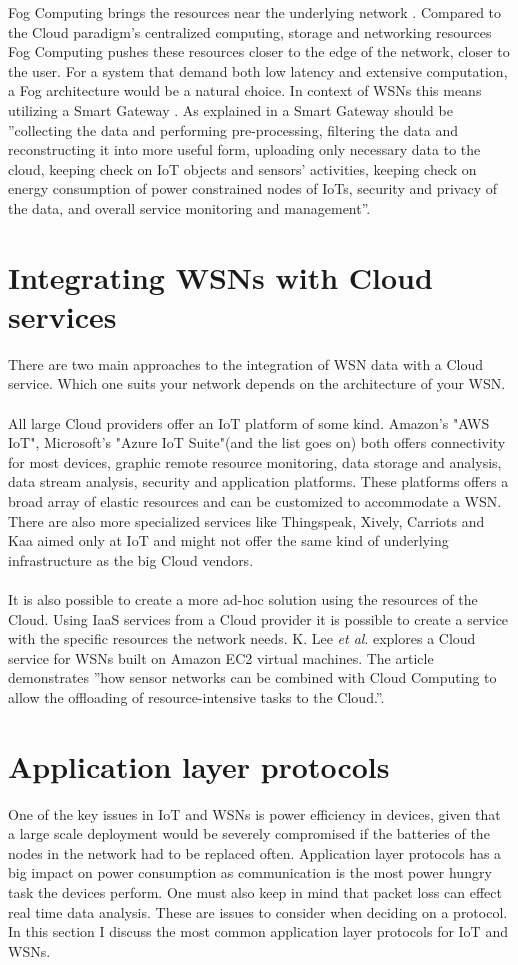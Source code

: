 \documentclass[]{uiophd}
\begin{document}
Fog Computing brings the resources near the underlying network \cite{6984239}. Compared to the Cloud paradigm's centralized computing, storage and networking resources Fog Computing pushes these resources closer to the edge of the network, closer to the user. For a system that demand both low latency and extensive computation, a Fog architecture would be a natural choice. In context of WSNs this means utilizing a Smart Gateway \cite{6984239}. As explained in \cite{69842392} a Smart Gateway should be ''collecting the data and performing pre-processing, filtering the data and reconstructing it into more useful form, uploading only necessary data to the cloud, keeping check on IoT objects and sensors’ activities, keeping check on energy consumption of power constrained nodes of IoTs, security and privacy of the data, and overall service monitoring and management''. 

\section{Integrating WSNs with Cloud services}
There are two main approaches to the integration of WSN data with a Cloud service. Which one suits your network depends on the architecture of your WSN.
\\\\
All large Cloud providers offer an IoT platform of some kind. Amazon's "AWS IoT", Microsoft's "Azure IoT Suite"(and the list goes on) both offers connectivity for most devices, graphic remote resource monitoring, data storage and analysis, data stream analysis, security and application platforms. These platforms offers a broad array of elastic resources and can be customized to accommodate a WSN. There are also more specialized services like Thingspeak, Xively, Carriots and Kaa aimed only at IoT and might not offer the same kind of underlying infrastructure as the big Cloud vendors.
\\\\
It is also possible to create a more ad-hoc solution using the resources of the Cloud. Using IaaS services from a Cloud provider it is possible to create a service with the specific resources the network needs. K. Lee \textit{et al}. \cite{5678063} explores a Cloud service for WSNs built on Amazon EC2 virtual machines. The article demonstrates ''how sensor networks can be combined with Cloud Computing to allow the offloading of resource-intensive tasks to the Cloud.''\cite{56780637}.

\section{Application layer protocols}
One of the key issues in IoT and WSNs is power efficiency in devices, given that a large scale deployment would be severely compromised if the batteries of the nodes in the network had to be replaced often. Application layer protocols has a big impact on power consumption as communication is the most power hungry task the devices perform. One must also keep in mind that packet loss can effect real time data analysis. These are issues to consider when deciding on a protocol. In this section I discuss the most common application layer protocols for IoT and WSNs.
\end{document}
